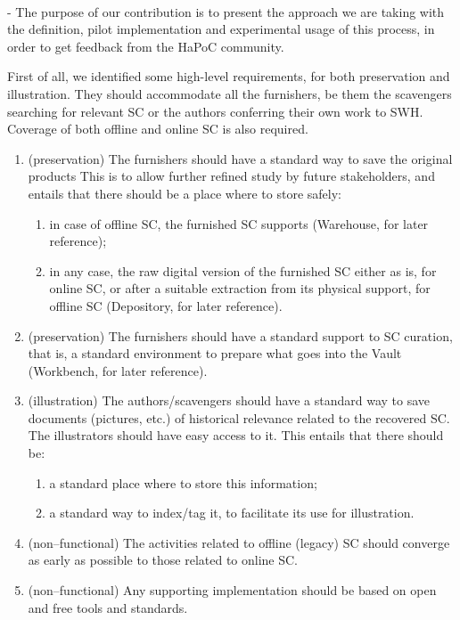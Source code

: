 \documentclass[a4paper]{article}
\begin{document}
\

 - The purpose of our contribution is to present the approach we are taking with the definition, pilot implementation and experimental usage of this process, in order to get feedback from the HaPoC community. 

First of all, we identified some high-level requirements, for both preservation and illustration. They should accommodate all the furnishers, be them the scavengers searching for relevant SC or the authors conferring their own work to SWH. Coverage of both offline and online SC is also required. 
\begin{enumerate}
	\item (preservation) The furnishers should have a standard way to save the original products This is to allow further refined study by future stakeholders, and entails that there should be a place where to store safely:
	\begin{enumerate}
		\item in case of offline SC, the furnished SC supports (Warehouse, for later reference);
		\item in any case, the raw digital version of the furnished SC either as is, for online SC, or after a suitable extraction from its physical support, for offline SC (Depository, for later reference).
	\end{enumerate}
	\item (preservation) The furnishers should have a standard support to SC curation, that is, a standard environment to prepare what goes into the  Vault (Workbench, for later reference). 
	\item (illustration) The authors/scavengers should have a standard way to save documents (pictures, etc.) of historical relevance related to the recovered SC. The illustrators should have easy access to it. This entails that there should be:
	\begin{enumerate}
		\item a standard place where to store this information;
		\item a standard way to index/tag it, to facilitate its use for illustration.
		\end{enumerate}
	\item (non--functional) The activities related to offline (legacy) SC should converge as early as possible to those related to online SC.
	\item (non--functional) Any supporting implementation should be based on open and free tools and standards. 
	
\end{enumerate}
\end{document}
